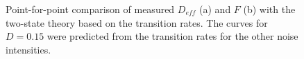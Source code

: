 \documentclass[12pt,a4paper]{article}
\begin{document}
\begin{figure}[H]
	\hspace*{-0.5cm}
	\caption{Point-for-point comparison of measured $D_{eff}$ (a) and $F$ (b) with the two-state theory based on the transition rates. The curves for $D=0.15$ were predicted from the transition rates for the other noise intensities.}
\end{figure}
\end{document}
